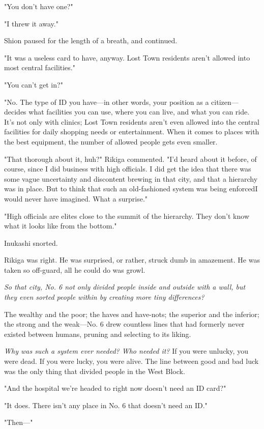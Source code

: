 "You don't have one?"

"I threw it away."

Shion paused for the length of a breath, and continued.

"It was a useless card to have, anyway. Lost Town residents aren't
allowed into most central facilities."

"You can't get in?"

"No. The type of ID you have---in other words, your position as a
citizen---decides what facilities you can use, where you can live, and
what you can ride. It's not only with clinics; Lost Town residents
aren't even allowed into the central facilities for daily shopping needs
or entertainment. When it comes to places with the best equipment, the
number of allowed people gets even smaller.

"That thorough about it, huh?" Rikiga commented. "I'd heard about it
before, of course, since I did business with high officials. I did get
the idea that there was some vague uncertainty and discontent brewing in
that city, and that a hierarchy was in place. But to think that such an
old-fashioned system was being enforced\el I would never have imagined.
What a surprise."

"High officials are elites close to the summit of the hierarchy. They
don't know what it looks like from the bottom."

Inukashi snorted.

Rikiga was right. He was surprised, or rather, struck dumb in amazement.
He was taken so off-guard, all he could do was growl.

\emph{So that city, No. 6 not only divided people inside and outside with a
wall, but they even sorted people within by creating more tiny
differences?}

The wealthy and the poor; the haves and have-nots; the superior and the
inferior; the strong and the weak---No. 6 drew countless lines that had
formerly never existed between humans, pruning and selecting to its
liking.

\emph{Why was such a system ever needed? Who needed it?} If you were unlucky,
you were dead. If you were lucky, you were alive. The line between good
and bad luck was the only thing that divided people in the West Block.

"And the hospital we're headed to right now doesn't need an ID card?"

"It does. There isn't any place in No. 6 that doesn't need an ID."

"Then---"

